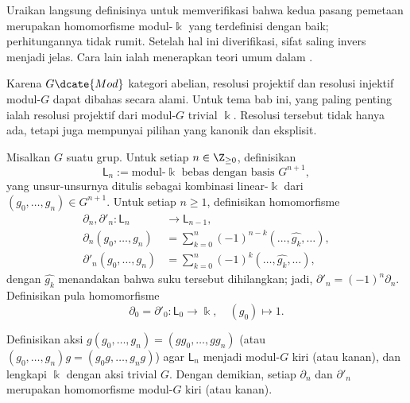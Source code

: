 \begin{bukti}
	Uraikan langsung definisinya untuk memverifikasi bahwa kedua pasang pemetaan
	merupakan homomorfisme modul-$\Bbbk$ yang terdefinisi dengan baik;
	perhitungannya tidak rumit. Setelah hal ini diverifikasi, sifat saling invers
	menjadi jelas. Cara lain ialah menerapkan teori umum dalam
	\cite[Korolari 6.6.8]{Li1}.
\end{bukti}

Karena $G\dcate{Mod}$ kategori abelian, resolusi projektif dan resolusi
injektif modul-$G$ dapat dibahas secara alami. Untuk tema bab ini, yang paling
penting ialah resolusi projektif dari modul-$G$ trivial $\Bbbk$. Resolusi
tersebut tidak hanya ada, tetapi juga mempunyai pilihan yang kanonik dan
eksplisit.

\begin{definisi}\label{def:resolution-trivial-module}
	Misalkan $G$ suatu grup. Untuk setiap $n\in\Z_{\geq0}$, definisikan
	\[ \mathsf{L}_n := \text{modul-$\Bbbk$ bebas dengan basis $G^{n+1}$}, \]
	yang unsur-unsurnya ditulis sebagai kombinasi linear-$\Bbbk$ dari
	$(g_0,\ldots,g_n)\in G^{n+1}$. Untuk setiap $n\geq1$, definisikan
	homomorfisme
	\begin{align*}
		\partial_n, \partial'_n: \mathsf{L}_n & \to \mathsf{L}_{n-1}, \\
		\partial_n\left( g_0, \ldots, g_n \right) & = \sum_{k=0}^n (-1)^{n-k} (\ldots, \widehat{g_k}, \ldots), \\
		\partial'_n\left( g_0, \ldots, g_n \right) & = \sum_{k=0}^n (-1)^k (\ldots, \widehat{g_k}, \ldots),
	\end{align*}
	dengan $\widehat{g_k}$ menandakan bahwa suku tersebut dihilangkan; jadi,
	$\partial'_n=(-1)^n\partial_n$. Definisikan pula homomorfisme
	\[ \partial_0 = \partial'_0: \mathsf{L}_0 \to \Bbbk, \quad (g_0) \mapsto 1. \]

	Definisikan aksi
	$g(g_0,\ldots,g_n)=(gg_0,\ldots,gg_n)$ (atau
	$(g_0,\ldots,g_n)g=(g_0g,\ldots,g_ng)$) agar $\mathsf{L}_n$ menjadi
	modul-$G$ kiri (atau kanan), dan lengkapi $\Bbbk$ dengan aksi trivial $G$.
	Dengan demikian, setiap $\partial_n$ dan $\partial'_n$ merupakan
	homomorfisme modul-$G$ kiri (atau kanan).
\end{definisi}

